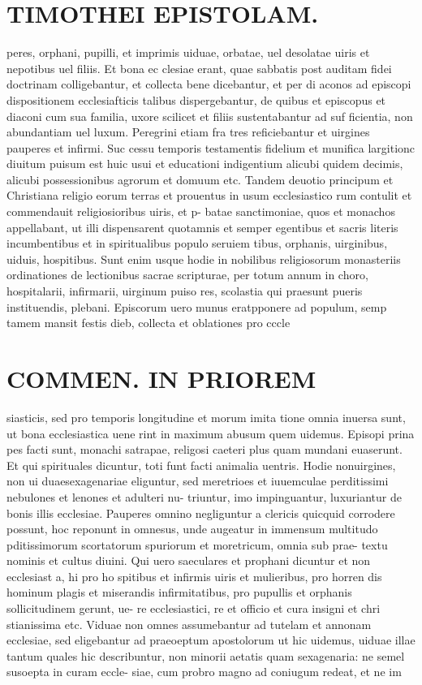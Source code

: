 \documentclass{article}
\begin{document}
\begin{pages}
\section*{TIMOTHEI EPISTOLAM. }
\marginpar{[ p.123 ]}\pstart peres, orphani, pupilli, et imprimis uiduae, orbatae, uel desolatae uiris et nepotibus uel filiis. Et bona ec clesiae erant, quae sabbatis post auditam fidei doctrinam colligebantur, et collecta bene dicebantur, et per di aconos ad episcopi dispositionem ecclesiafticis talibus dispergebantur, de quibus et episcopus et diaconi cum sua familia, uxore scilicet et filiis sustentabantur ad suf ficientia, non abundantiam uel luxum. Peregrini etiam fra tres reficiebantur et uirgines pauperes et infirmi. Suc cessu temporis testamentis fidelium et munifica largitionc diuitum puisum est huic usui et educationi indigentium alicubi quidem decimis, alicubi possessionibus agrorum et domuum etc. Tandem deuotio principum et Christiana religio eorum terras et prouentus in usum ecclesiastico rum contulit et commendauit religiosioribus uiris, et p- batae sanctimoniae, quos et monachos appellabant, ut illi dispensarent quotamnis et semper egentibus et sacris literis incumbentibus et in spiritualibus populo seruiem tibus, orphanis, uirginibus, uiduis, hospitibus. Sunt enim usque hodie in nobilibus religiosorum monasteriis ordinationes de lectionibus sacrae scripturae, per totum annum in choro, hospitalarii, infirmarii, uirginum puiso res, scolastia qui praesunt pueris instituendis, plebani. Episcorum uero munus eratpponere ad populum, semp tamem mansit festis dieb, collecta et oblationes pro cccle  \pend
\section*{COMMEN. IN PRIOREM }
\marginpar{[ p.124 ]}\pstart siasticis, sed pro temporis longitudine et morum imita tione omnia inuersa sunt, ut bona ecclesiastica uene rint in maximum abusum quem uidemus. Episopi prina pes facti sunt, monachi satrapae, religosi caeteri plus quam mundani euaserunt. Et qui spirituales dicuntur, toti funt facti animalia uentris. Hodie nonuirgines, non ui duaesexagenariae eliguntur, sed meretrioes et iuuemculae perditissimi nebulones et lenones et adulteri nu- triuntur, imo impinguantur, luxuriantur de bonis illis ecclesiae. Pauperes omnino negliguntur a clericis quicquid corrodere possunt, hoc reponunt in omnesus, unde augeatur in immensum multitudo pditissimorum scortatorum spuriorum et moretricum, omnia sub prae- textu nominis et cultus diuini. Qui uero saeculares et prophani dicuntur et non ecclesiast a, hi pro ho spitibus et infirmis uiris et mulieribus, pro horren dis hominum plagis et miserandis infirmitatibus, pro pupullis et orphanis sollicitudinem gerunt, ue- re ecclesiastici, re et officio et cura insigni et chri stianissima etc. Viduae non omnes assumebantur ad tutelam et annonam ecclesiae, sed eligebantur ad praeoeptum apostolorum ut hic uidemus, uiduae illae tantum quales hic describuntur, non minorii aetatis quam sexagenaria: ne semel susoepta in curam eccle- siae, cum probro magno ad coniugum redeat, et ne im  \pend

\end{pages}
\end{document}
